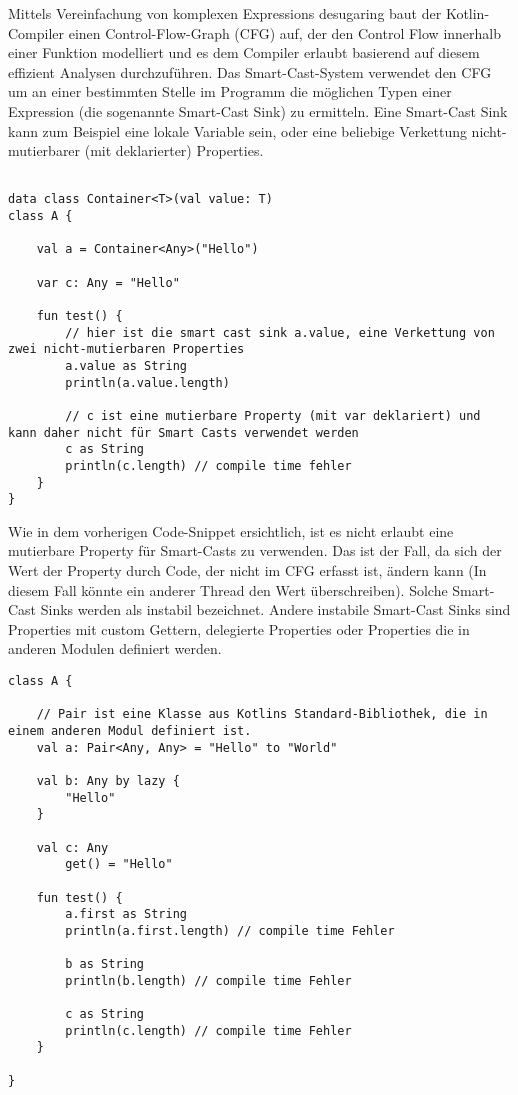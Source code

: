 Mittels Vereinfachung von komplexen Expressions \bzw desugaring baut der Kotlin-Compiler einen Control-Flow-Graph (CFG)
auf, der den Control Flow innerhalb einer Funktion modelliert und es dem Compiler erlaubt basierend auf diesem effizient
Analysen durchzuführen.\cite{kspeCFG}
Das Smart-Cast-System verwendet den CFG um an einer bestimmten Stelle im Programm die möglichen Typen einer Expression
(die sogenannte Smart-Cast Sink) zu ermitteln.
Eine Smart-Cast Sink kann zum Beispiel eine lokale Variable sein, oder eine beliebige Verkettung nicht-mutierbarer
(mit  deklarierter) Properties.

\begin{verbatim}

data class Container<T>(val value: T)
class A {

    val a = Container<Any>("Hello")

    var c: Any = "Hello"

    fun test() {
        // hier ist die smart cast sink a.value, eine Verkettung von zwei nicht-mutierbaren Properties
        a.value as String
        println(a.value.length)

        // c ist eine mutierbare Property (mit var deklariert) und kann daher nicht für Smart Casts verwendet werden
        c as String
        println(c.length) // compile time fehler
    }
}
\end{verbatim}

Wie in dem vorherigen Code-Snippet ersichtlich, ist es nicht erlaubt eine mutierbare Property für Smart-Casts zu
verwenden.
Das ist der Fall, da sich der Wert der Property durch Code, der nicht im CFG erfasst ist, ändern kann (In diesem Fall
könnte ein anderer Thread den Wert überschreiben).
Solche Smart-Cast Sinks werden als instabil bezeichnet.
Andere instabile Smart-Cast Sinks sind \zB Properties mit custom Gettern, delegierte Properties oder Properties die
in anderen Modulen definiert werden.

\begin{verbatim}
class A {

    // Pair ist eine Klasse aus Kotlins Standard-Bibliothek, die in einem anderen Modul definiert ist.
    val a: Pair<Any, Any> = "Hello" to "World"

    val b: Any by lazy {
        "Hello"
    }

    val c: Any
        get() = "Hello"

    fun test() {
        a.first as String
        println(a.first.length) // compile time Fehler

        b as String
        println(b.length) // compile time Fehler

        c as String
        println(c.length) // compile time Fehler
    }

}
\end{verbatim}

